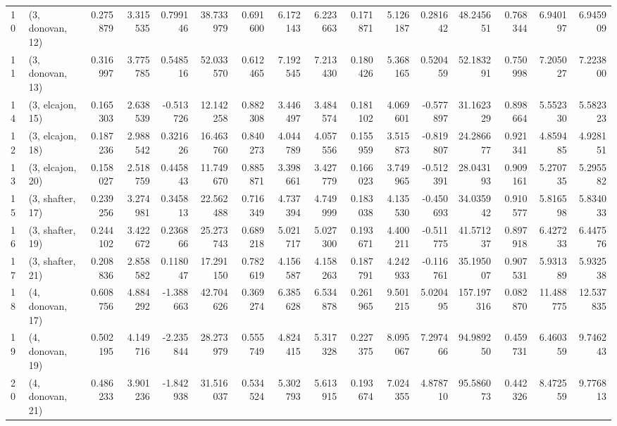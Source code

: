 \begin{tabular}{llrrrrrrrrrrrrrr}
10 &  (3, donovan, 12) &   0.275879 &  3.315535 &  0.799146 &   38.733979 &  0.691600 &   6.172143 &   6.223663 &  0.171871 &  5.126187 &  0.281642 &   48.245651 &  0.768344 &   6.940197 &   6.945909 \\
11 &  (3, donovan, 13) &   0.316997 &  3.775785 &  0.548516 &   52.033570 &  0.612465 &   7.192545 &   7.213430 &  0.180426 &  5.368165 &  0.520459 &   52.183291 &  0.750998 &   7.205027 &   7.223800 \\
14 &  (3, elcajon, 15) &   0.165303 &  2.638539 & -0.513726 &   12.142258 &  0.882308 &   3.446497 &   3.484574 &  0.181102 &  4.069601 & -0.577897 &   31.162329 &  0.898664 &   5.552330 &   5.582323 \\
12 &  (3, elcajon, 18) &   0.187236 &  2.988542 &  0.321626 &   16.463760 &  0.840273 &   4.044789 &   4.057556 &  0.155959 &  3.515873 & -0.819807 &   24.286677 &  0.921341 &   4.859485 &   4.928151 \\
13 &  (3, elcajon, 20) &   0.158027 &  2.518759 &  0.445843 &   11.749670 &  0.885871 &   3.398661 &   3.427779 &  0.166023 &  3.749965 & -0.512391 &   28.043193 &  0.909161 &   5.270735 &   5.295582 \\
15 &  (3, shafter, 17) &   0.239256 &  3.274981 &  0.345813 &   22.562488 &  0.716349 &   4.737394 &   4.749999 &  0.183038 &  4.135530 & -0.450693 &   34.035942 &  0.910577 &   5.816598 &   5.834033 \\
16 &  (3, shafter, 19) &   0.244102 &  3.422672 &  0.236866 &   25.273743 &  0.689218 &   5.021717 &   5.027300 &  0.193671 &  4.400211 & -0.511775 &   41.571237 &  0.897918 &   6.427233 &   6.447576 \\
17 &  (3, shafter, 21) &   0.208836 &  2.858582 &  0.118047 &   17.291150 &  0.782619 &   4.156587 &   4.158263 &  0.187791 &  4.242933 & -0.116761 &   35.195007 &  0.907531 &   5.931389 &   5.932538 \\
18 &  (4, donovan, 17) &   0.608756 &  4.884292 & -1.388663 &   42.704626 &  0.369274 &   6.385628 &   6.534878 &  0.261965 &  9.501215 &  5.020495 &  157.197316 &  0.082870 &  11.488775 &  12.537835 \\
19 &  (4, donovan, 19) &   0.502195 &  4.149716 & -2.235844 &   28.273979 &  0.555749 &   4.824415 &   5.317328 &  0.227375 &  8.095067 &  7.297466 &   94.989250 &  0.459731 &   6.460359 &   9.746243 \\
20 &  (4, donovan, 21) &   0.486233 &  3.901236 & -1.842938 &   31.516037 &  0.534524 &   5.302793 &   5.613915 &  0.193674 &  7.024355 &  4.878710 &   95.586073 &  0.442326 &   8.472559 &   9.776813 \\

\end{tabular}
